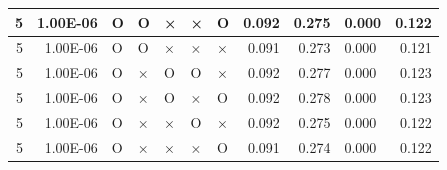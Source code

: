 \documentclass[11pt]{article}
\begin{document}
\begin{longtable}[h]{|r|r|l|l|l|l|l|r|r|l|r|}
5                                 & 1.00E-06                         & O                                & O                                & ×                                & ×                                & O                                 & 0.092                             & 0.275                             & 0.000                              & 0.122                               \\ \hline
5                                 & 1.00E-06                         & O                                & O                                & ×                                & ×                                & ×                                 & 0.091                             & 0.273                             & 0.000                              & 0.121                               \\ \hline
5                                 & 1.00E-06                         & O                                & ×                                & O                                & O                                & ×                                 & 0.092                             & 0.277                             & 0.000                              & 0.123                               \\ \hline
5                                 & 1.00E-06                         & O                                & ×                                & O                                & ×                                & O                                 & 0.092                             & 0.278                             & 0.000                              & 0.123                               \\ \hline
5                                 & 1.00E-06                         & O                                & ×                                & ×                                & O                                & ×                                 & 0.092                             & 0.275                             & 0.000                              & 0.122                               \\ \hline
5                                 & 1.00E-06                         & O                                & ×                                & ×                                & ×                                & O                                 & 0.091                             & 0.274                             & 0.000                              & 0.122                               \\ \hline

\end{longtable}
\end{document}
